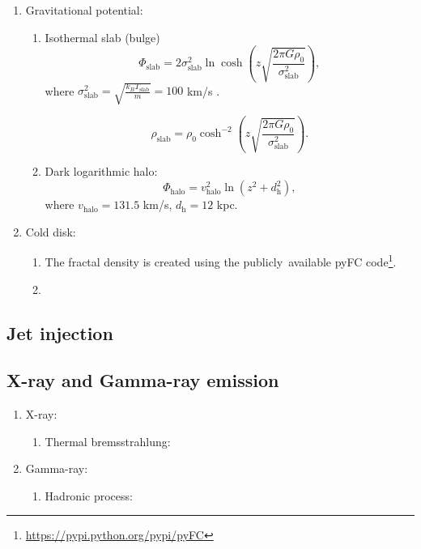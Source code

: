 \documentclass[twocolumn]{aastex631}
\begin{document}
\begin{enumerate}
\item Gravitational potential:
  \begin{enumerate}
    \item Isothermal slab (bulge)
         \begin{equation}
           \Phi_{\text{slab}}=2\sigma^2_{\text{slab}}\ln\cosh\left(z\sqrt{\frac{2\pi G\rho_{0}}{\sigma^2_{\text{slab}}}}\right),
         \end{equation}
          where $\displaystyle \sigma^2_{\text{slab}}=\sqrt{\frac{k_{B}T_{\text{slab}}}{m}}=100$ km/s \citep{velocity-dispersion-MW}.

         \begin{equation}
           \rho_{\text{slab}} = \rho_{0}\cosh^{-2}\left(z\sqrt{\frac{2\pi G \rho_{0}}{\sigma^2_{\text{slab}}}}\right).
         \end{equation}
    \item Dark logarithmic halo:
         \begin{equation}
           \Phi_{\text{halo}}=v^2_{\text{halo}}\ln\left(z^2+d^2_{\text{h}}\right),
         \end{equation}
         where $v_{\text{halo}}=131.5$ km/s, $d_{\text{h}}=12$ kpc.
  \end{enumerate}

\item Cold disk:
  \begin{enumerate}
    \item The fractal density is created using the publicly\
          available pyFC code\footnote{\url{https://pypi.python.org/pypi/pyFC}}.
    \item
  \end{enumerate}
\end{enumerate}

\subsection{Jet injection}

\subsection{X-ray and Gamma-ray emission}
  \begin{enumerate}
    \item X-ray:
       \begin{enumerate}
         \item Thermal bremsstrahlung:
       \end{enumerate}
    \item Gamma-ray:
       \begin{enumerate}
         \item Hadronic process:
       \end{enumerate}
  \end{enumerate}
\end{document}
